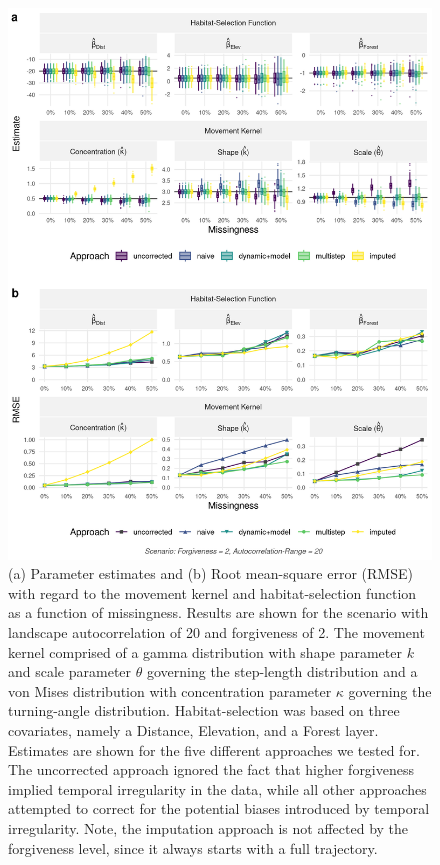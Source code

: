 \documentclass[../FinalThesis.tex]{subfiles}
\begin{document}
\begin{figure}[htpb]
  \begin{center}
  \includegraphics[width = \textwidth]{Figures/ModelComparisonMissingness.png}
  \caption{(a) Parameter estimates and (b) Root mean-square error (RMSE) with
  regard to the movement kernel and habitat-selection function as a function of
  missingness. Results are shown for the scenario with landscape autocorrelation
  of 20 and forgiveness of 2. The movement kernel comprised of a gamma
  distribution with shape parameter $k$ and scale parameter $\theta$ governing
  the step-length distribution and a von Mises distribution with concentration
  parameter $\kappa$ governing the turning-angle distribution. Habitat-selection
  was based on three covariates, namely a \textsf{Distance}, \textsf{Elevation},
  and a \textsf{Forest} layer. Estimates are shown for the five different
  approaches we tested for. The uncorrected approach ignored the fact that
  higher forgiveness implied temporal irregularity in the data, while all other
  approaches attempted to correct for the potential biases introduced by
  temporal irregularity. Note, the imputation approach is not affected by the
  forgiveness level, since it always starts with a full trajectory.}
  \label{ModelComparisonMissingness}
  \end{center}
\end{figure}
\end{document}
